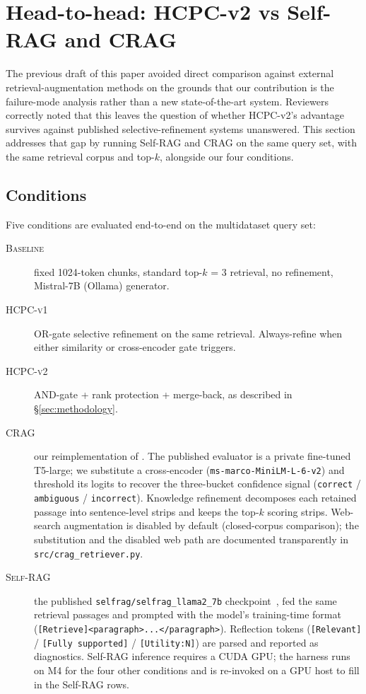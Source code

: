 \section{Head-to-head: HCPC-v2 vs Self-RAG and CRAG}
\label{sec:headtohead}

The previous draft of this paper avoided direct comparison against
external retrieval-augmentation methods on the grounds that our
contribution is the failure-mode analysis rather than a new
state-of-the-art system. Reviewers correctly noted that this leaves the
question of whether HCPC-v2's advantage survives against published
selective-refinement systems unanswered. This section addresses that gap
by running Self-RAG and CRAG on the same query set, with the same
retrieval corpus and top-$k$, alongside our four conditions.

\subsection{Conditions}

Five conditions are evaluated end-to-end on the multidataset query set:

\begin{description}
  \item[\textsc{Baseline}] fixed 1024-token chunks, standard top-$k$ = 3
        retrieval, no refinement, Mistral-7B (Ollama) generator.
  \item[\textsc{HCPC-v1}] OR-gate selective refinement on the same
        retrieval. Always-refine when either similarity or cross-encoder
        gate triggers.
  \item[\textsc{HCPC-v2}] AND-gate + rank protection + merge-back, as
        described in §\ref{sec:methodology}.
  \item[\textsc{CRAG}] our reimplementation of \citet{yan2024crag}. The
        published evaluator is a private fine-tuned T5-large; we
        substitute a cross-encoder
        (\texttt{ms-marco-MiniLM-L-6-v2}) and threshold its logits to
        recover the three-bucket confidence signal (\texttt{correct} /
        \texttt{ambiguous} / \texttt{incorrect}). Knowledge refinement
        decomposes each retained passage into sentence-level strips and
        keeps the top-$k$ scoring strips. Web-search augmentation is
        disabled by default (closed-corpus comparison); the substitution
        and the disabled web path are documented transparently in
        \texttt{src/crag\_retriever.py}.
  \item[\textsc{Self-RAG}] the published
        \texttt{selfrag/selfrag\_llama2\_7b}
        checkpoint~\citep{asai2024selfrag}, fed the same retrieval
        passages and prompted with the model's training-time format
        (\texttt{[Retrieve]<paragraph>...</paragraph>}). Reflection
        tokens (\texttt{[Relevant]} / \texttt{[Fully supported]} /
        \texttt{[Utility:N]}) are parsed and reported as diagnostics.
        Self-RAG inference requires a CUDA GPU; the harness runs on M4
        for the four other conditions and is re-invoked on a GPU host to
        fill in the Self-RAG rows.
\end{description}

